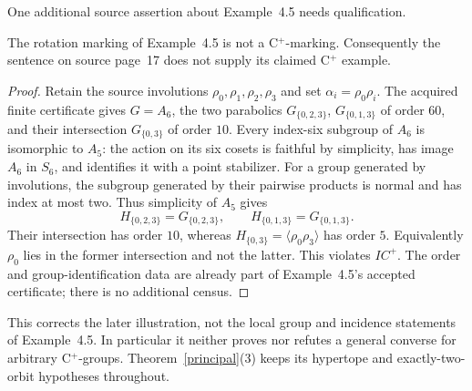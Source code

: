 \documentclass[11pt,a4paper]{article}
\newcommand{\gen}[1]{\langle#1\rangle}\newcommand{\Aut}{\operatorname{Aut}}
\begin{document}
One additional source assertion about Example~4.5 needs qualification.
\begin{proposition}\label{a6}
The rotation marking of Example~4.5 is not a C$^+$-marking. Consequently
the sentence on source page~17 does not supply its claimed C$^+$ example.
\end{proposition}
\begin{proof}
Retain the source involutions $\rho_0,\rho_1,\rho_2,\rho_3$ and set
$\alpha_i=\rho_0\rho_i$. The acquired finite certificate gives $G=A_6$, the two parabolics
$G_{\{0,2,3\}}$, $G_{\{0,1,3\}}$ of order $60$, and their intersection
$G_{\{0,3\}}$ of order $10$. Every index-six subgroup of $A_6$ is
isomorphic to $A_5$: the action on its six cosets is faithful by simplicity,
has image $A_6$ in $S_6$, and identifies it with a point stabilizer.
For a group generated by involutions, the subgroup generated by their
pairwise products is normal and has index at most two. Thus simplicity
of $A_5$ gives
\[
 H_{\{0,2,3\}}=G_{\{0,2,3\}},\qquad
 H_{\{0,1,3\}}=G_{\{0,1,3\}}.
\]
Their intersection has order $10$, whereas
$H_{\{0,3\}}=\gen{\rho_0\rho_3}$ has order $5$.
Equivalently $\rho_0$ lies in the former intersection and not the latter.
This violates $IC^+$. The order and group-identification data are already
part of Example~4.5's accepted certificate; there is no additional census.
\end{proof}
This corrects the later illustration, not the local group and incidence
statements of Example~4.5. In particular it neither proves nor refutes a
general converse for arbitrary C$^+$-groups. Theorem~\ref{principal}(3)
keeps its hypertope and exactly-two-orbit hypotheses throughout.
\end{document}
